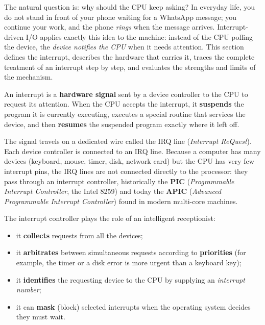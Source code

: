 \documentclass[11pt]{article}
\newcommand{\cle}[1]{{\popxbold\color{popdark}#1}}
\newcounter{popsec}
\newcounter{popsub}
\newcommand{\courssub}[1]{%
  \stepcounter{popsub}%
  \par\vspace{9pt}\noindent{\popxbold\fontsize{11.5}{13}\selectfont\color{popink}{\color{poporange}\thepopsec.\thepopsub}\hspace{6pt}#1}\par\nopagebreak\vspace{4pt}
}
\begin{document}
The natural question is: why should the CPU keep asking? In everyday life, you do not stand in front of your phone waiting for a WhatsApp message; you continue your work, and the phone \emph{rings} when the message arrives. Interrupt-driven I/O applies exactly this idea to the machine: instead of the CPU polling the device, the \emph{device notifies the CPU} when it needs attention. This section defines the interrupt, describes the hardware that carries it, traces the complete treatment of an interrupt step by step, and evaluates the strengths and limits of the mechanism.

\courssub{The Idea of an Interrupt}

\begin{definition}[Interrupt]
An \cle{interrupt} is a \textbf{hardware signal} sent by a device controller to the CPU to request its attention. When the CPU accepts the interrupt, it \textbf{suspends} the program it is currently executing, executes a special routine that services the device, and then \textbf{resumes} the suspended program exactly where it left off.
\end{definition}

The signal travels on a dedicated wire called the \cle{IRQ} line (\emph{Interrupt ReQuest}). Each device controller is connected to an IRQ line. Because a computer has many devices (keyboard, mouse, timer, disk, network card) but the CPU has very few interrupt pins, the IRQ lines are not connected directly to the processor: they pass through an \cle{interrupt controller}, historically the \textbf{PIC} (\emph{Programmable Interrupt Controller}, the Intel 8259) and today the \textbf{APIC} (\emph{Advanced Programmable Interrupt Controller}) found in modern multi-core machines.

The interrupt controller plays the role of an intelligent receptionist:
\begin{itemize}
\item it \textbf{collects} requests from all the devices;
\item it \textbf{arbitrates} between simultaneous requests according to \textbf{priorities} (for example, the timer or a disk error is more urgent than a keyboard key);
\item it \textbf{identifies} the requesting device to the CPU by supplying an \emph{interrupt number};
\item it can \textbf{mask} (block) selected interrupts when the operating system decides they must wait.
\end{itemize}
\end{document}
